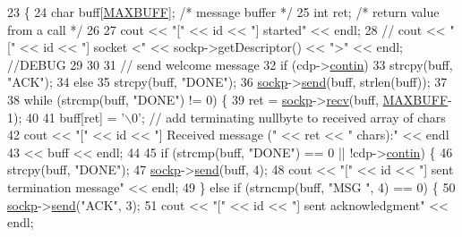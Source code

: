 \begin{DoxyCode}
23                                             \{
24   \textcolor{keywordtype}{char} buff[\hyperlink{classWorker_a2749db22d3591fe663b9a25e90a88e9d}{MAXBUFF}];  \textcolor{comment}{/* message buffer */}
25   \textcolor{keywordtype}{int} ret;  \textcolor{comment}{/* return value from a call */}
26 
27     cout << \textcolor{stringliteral}{"["} << \textcolor{keywordtype}{id} << \textcolor{stringliteral}{"] started"} << endl;
28   \textcolor{comment}{// cout << "[" << id << "] socket <" << sockp->getDescriptor() << ">" << endl; //DEBUG}
29 
30 
31   \textcolor{comment}{// send welcome message}
32     \textcolor{keywordflow}{if} (cdp->\hyperlink{structControlData_ac8fbf80345423cf5650ae64bfb10dc88}{contin}) 
33       strcpy(buff, \textcolor{stringliteral}{"ACK"});
34     \textcolor{keywordflow}{else}
35       strcpy(buff, \textcolor{stringliteral}{"DONE"});
36     \hyperlink{classWorker_a4562eb405aea20c7ac8a552e2075898f}{sockp}->\hyperlink{classSocket_aca3e5b9c5459a50bd8fb03d29ef9e48e}{send}(buff, strlen(buff));  
37 
38     \textcolor{keywordflow}{while} (strcmp(buff, \textcolor{stringliteral}{"DONE"}) != 0) \{
39       ret = \hyperlink{classWorker_a4562eb405aea20c7ac8a552e2075898f}{sockp}->\hyperlink{classSocket_a1830972b26797cde234054f81f0921de}{recv}(buff, \hyperlink{classWorker_a2749db22d3591fe663b9a25e90a88e9d}{MAXBUFF}-1);
40 
41     buff[ret] = \textcolor{charliteral}{'\(\backslash\)0'};  \textcolor{comment}{// add terminating nullbyte to received array of chars}
42     cout << \textcolor{stringliteral}{"["} << \textcolor{keywordtype}{id} << \textcolor{stringliteral}{"] Received message ("} << ret << \textcolor{stringliteral}{" chars):"} << endl 
43     << buff << endl;
44 
45     \textcolor{keywordflow}{if} (strcmp(buff, \textcolor{stringliteral}{"DONE"}) == 0 || !cdp->\hyperlink{structControlData_ac8fbf80345423cf5650ae64bfb10dc88}{contin}) \{
46       strcpy(buff, \textcolor{stringliteral}{"DONE"});
47       \hyperlink{classWorker_a4562eb405aea20c7ac8a552e2075898f}{sockp}->\hyperlink{classSocket_aca3e5b9c5459a50bd8fb03d29ef9e48e}{send}(buff, 4);
48       cout << \textcolor{stringliteral}{"["} << \textcolor{keywordtype}{id} << \textcolor{stringliteral}{"] sent termination message"} << endl;
49     \} \textcolor{keywordflow}{else} \textcolor{keywordflow}{if} (strncmp(buff, \textcolor{stringliteral}{"MSG "}, 4) == 0) \{
50       \hyperlink{classWorker_a4562eb405aea20c7ac8a552e2075898f}{sockp}->\hyperlink{classSocket_aca3e5b9c5459a50bd8fb03d29ef9e48e}{send}(\textcolor{stringliteral}{"ACK"}, 3);
51       cout << \textcolor{stringliteral}{"["} << \textcolor{keywordtype}{id} << \textcolor{stringliteral}{"] sent acknowledgment"} << endl;

\end{DoxyCode}
